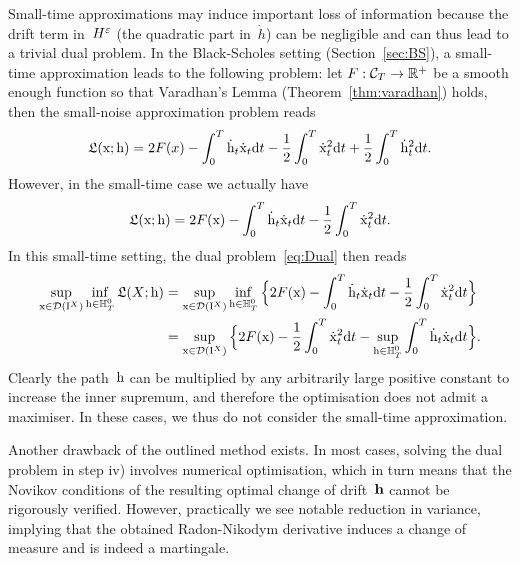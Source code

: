 \begin{remark}
Small-time approximations may induce important loss of information
because the drift term in~$H^\varepsilon$ (the quadratic part in~$\dot{h}$) can be negligible and can thus lead to a trivial dual problem. 
In the Black-Scholes setting (Section~\ref{sec:BS}),
a small-time approximation leads to the following problem: 
let $F:\mathcal{C}_T\rightarrow\mathbb{R}^+$ be a smooth enough function so that Varadhan's Lemma (Theorem~\ref{thm:varadhan}) holds, then the small-noise approximation problem reads
$$
\mathfrak{L}(\mathrm{x};\mathrm{h}) = 2 F(x)  - \int_0^T\dot{\mathrm{h}}_t \dot{\mathrm{x}}_t\mathrm{d} t
- \frac{1}{2}\int_0^T\dot{\mathrm{x}}_t^2\mathrm{d} t
+ \frac{1}{2}\int_0^T\dot{\mathrm{h}}_t^2\mathrm{d} t.
$$
However, in the small-time case we actually have
$$
\mathfrak{L}(\mathrm{x};\mathrm{h}) = 
2F(\mathrm{x}) - \int_0^T\dot{\mathrm{h}}_t \dot{\mathrm{x}}_t\mathrm{d} t
- \frac{1}{2}\int_0^T\dot{\mathrm{x}}_t^2\mathrm{d} t.
$$
In this small-time setting, the dual problem~\eqref{eq:Dual} then reads
\begin{align*}
\sup_{\mathrm{x}\in\mathcal{D}(\mathrm{I}^{X})}\inf_{\mathrm{h}\in\mathbb{H}^0_T} \mathfrak{L}(X;\mathrm{h})
 & = \sup_{\mathrm{x}\in \mathcal{D}(\mathrm{I}^{X})} \inf_{\mathrm{h}\in\mathbb{H}^0_T} \Big\{2F(\mathrm{x}) - \int_0^T\dot{\mathrm{h}}_t \dot{\mathrm{x}}_t\mathrm{d} t - \frac{1}{2}\int_0^T\dot{\mathrm{x}}_t^2\mathrm{d} t\Big\}\\
 & = \sup_{\mathrm{x}\in \mathcal{D}(\mathrm{I}^{X})} \Big\{2F(\mathrm{x})
 - \frac{1}{2}\int_0^T\dot{\mathrm{x}}_t^2\mathrm{d} t
 - \sup_{\mathrm{h}\in\mathbb{H}^0_T}\int_0^T\dot{\mathrm{h}}_t \dot{\mathrm{x}}_t\mathrm{d} t\Big\}.
\end{align*}
Clearly the path~$\mathrm{h}$ can be multiplied by any arbitrarily large positive constant to increase the inner supremum, 
and therefore the optimisation does not admit a maximiser.
In these cases, we thus do not consider the small-time approximation.
\end{remark}
\begin{remark}
Another drawback of the outlined method exists. In most cases, solving the dual problem in step iv) involves numerical optimisation, which in turn means that the Novikov conditions of the resulting optimal change of drift~$\boldsymbol{\mathrm{h}}$ cannot be rigorously verified. However, practically we see notable reduction in variance, implying that the obtained Radon-Nikodym derivative induces a change of measure and is indeed a martingale.
\end{remark}

